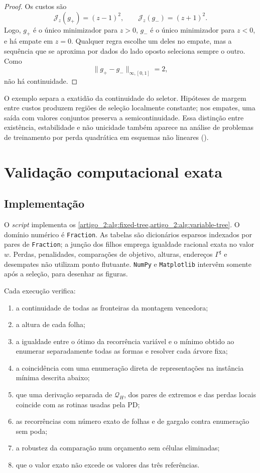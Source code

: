 \documentclass[12pt,a4paper]{article}
\makeatletter
\theoremstyle{preciso}
\theoremstyle{definition}
\newcommand{\cost}{\mathcal{J}}
\theoremstyle{preciso}
\theoremstyle{preciso}
\theoremstyle{preciso}
\theoremstyle{preciso}
\theoremstyle{definition}
\theoremstyle{preciso}
\theoremstyle{definition}
\theoremstyle{preciso}
\theoremstyle{preciso}
\theoremstyle{definition}
\newcommand{\abntlookup}[2]{\ifcsname ab#1@#2\endcsname\csname ab#1@#2\endcsname\else\textbf{??}\PackageWarning{abnt}{Citacao indefinida: #2}\fi}
\newcommand{\abntpar}[1]{\hyperlink{bib:#1}{\abntlookup{U}{#1}, \abntlookup{Y}{#1}}}
\newcommand{\abntsep}{}
\newcommand{\abntpitem}[1]{\abntsep\renewcommand{\abntsep}{; }\abntpar{#1}}
\newcommand{\citep}[2][]{\begingroup\renewcommand{\abntsep}{}(\forcsvlist{\abntpitem}{#2}\ifblank{#1}{}{, #1})\endgroup}
\makeatother
\begin{document}
\begin{proof}
Os custos são
\[
 \cost_z(g_+)=(z-1)^2,\qquad
 \cost_z(g_-)=(z+1)^2.
\]
Logo, $g_+$ é o único minimizador para $z>0$, $g_-$ é o único minimizador para
$z<0$, e há empate em $z=0$. Qualquer regra escolhe um deles no empate, mas a
sequência que se aproxima por dados do lado oposto seleciona sempre o outro.
Como
\[
 \|g_+-g_-\|_{\infty,[0,1]}=2,
\]
não há continuidade.
\end{proof}

O exemplo separa a exatidão da continuidade do seletor. Hipóteses de margem
entre custos produzem regiões de seleção localmente constante; nos empates,
uma saída com valores conjuntos preserva a semicontinuidade. Essa distinção entre
existência, estabilidade e não unicidade também aparece na análise de problemas
de treinamento por perda quadrática em esquemas não lineares
\citep{artigo_1-christof2021}.

\section{Validação computacional exata}
\label{artigo_2:sec:numerical}

\subsection{Implementação}

O \emph{script}
implementa os \cref{artigo_2:alg:fixed-tree,artigo_2:alg:variable-tree}. O domínio numérico é
\texttt{Fraction}. As tabelas são dicionários esparsos indexados
por pares de \texttt{Fraction}; a junção dos filhos emprega igualdade racional
exata no valor $w$. Perdas, penalidades, comparações de objetivo, alturas,
endereços $\Gamma^\sharp$ e desempates não utilizam ponto flutuante.
\texttt{NumPy} e \texttt{Matplotlib} intervêm somente após a seleção, para
desenhar as figuras.

Cada execução verifica:
\begin{enumerate}[label=(\alph*),leftmargin=2em]
 \item a continuidade de todas as fronteiras da montagem vencedora;
 \item a altura de cada folha;
 \item a igualdade entre o ótimo da recorrência variável e o mínimo obtido ao
 enumerar separadamente todas as formas e resolver cada árvore fixa;
 \item a coincidência com uma enumeração direta de representações na
 instância mínima descrita abaixo;
 \item que uma derivação separada de $\mathcal Q_H$, dos pares de extremos
 e das perdas locais coincide com as rotinas usadas pela PD;
 \item as recorrências com número exato de folhas e de gargalo contra
 enumeração sem poda;
 \item a robustez da comparação num orçamento sem células eliminadas;
 \item que o valor exato não excede os valores das três referências.
\end{enumerate}
\end{document}
